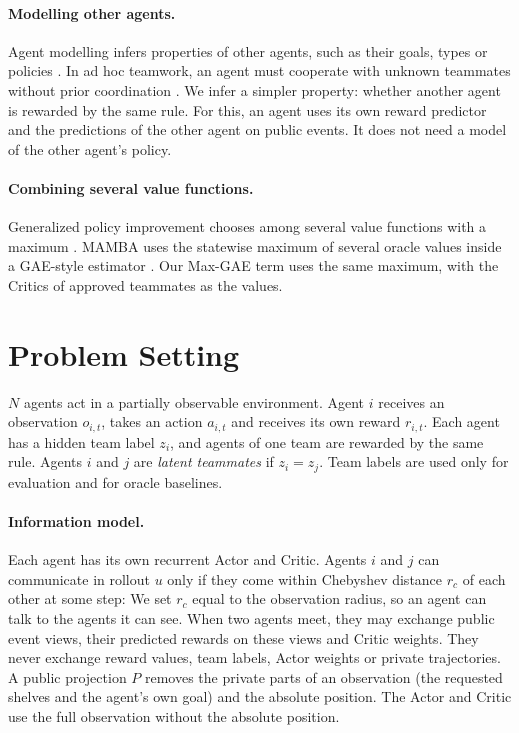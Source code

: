 \documentclass{article}
\begin{document}
\paragraph{Modelling other agents.}
Agent modelling infers properties of other agents, such as their goals, types or policies \cite{modelling}. In ad hoc teamwork, an agent must cooperate with unknown teammates without prior coordination \cite{adhoc}. We infer a simpler property: whether another agent is rewarded by the same rule. For this, an agent uses its own reward predictor and the predictions of the other agent on public events. It does not need a model of the other agent's policy.

\paragraph{Combining several value functions.}
Generalized policy improvement chooses among several value functions with a maximum \cite{gpi}. MAMBA uses the statewise maximum of several oracle values inside a GAE-style estimator \cite{mamba}. Our Max-GAE term uses the same maximum, with the Critics of approved teammates as the values.

\section{Problem Setting}
$N$ agents act in a partially observable environment. Agent $i$ receives an observation $o_{i,t}$, takes an action $a_{i,t}$ and receives its own reward $r_{i,t}$. Each agent has a hidden team label $z_i$, and agents of one team are rewarded by the same rule. Agents $i$ and $j$ are \emph{latent teammates} if $z_i=z_j$. Team labels are used only for evaluation and for oracle baselines.

\paragraph{Information model.}
Each agent has its own recurrent Actor and Critic. Agents $i$ and $j$ can communicate in rollout $u$ only if they come within Chebyshev distance $r_c$ of each other at some step:
\DonorEquation
We set $r_c$ equal to the observation radius, so an agent can talk to the agents it can see. When two agents meet, they may exchange public event views, their predicted rewards on these views and Critic weights. They never exchange reward values, team labels, Actor weights or private trajectories. A public projection $P$ removes the private parts of an observation (the requested shelves and the agent's own goal) and the absolute position. The Actor and Critic use the full observation without the absolute position.
\end{document}
